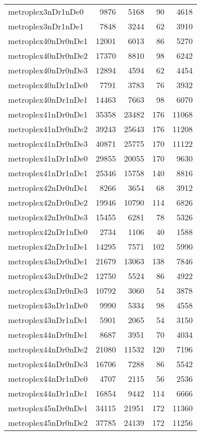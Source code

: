 \begin{longtable}{lrrrr}
metroplex3nDr1nDe0 & 9876 & 5168 & 90 & 4618 \\
metroplex3nDr1nDe1 & 7848 & 3244 & 62 & 3910 \\
metroplex40nDr0nDe1 & 12001 & 6013 & 86 & 5270 \\
metroplex40nDr0nDe2 & 17370 & 8810 & 98 & 6242 \\
metroplex40nDr0nDe3 & 12894 & 4594 & 62 & 4454 \\
metroplex40nDr1nDe0 & 7791 & 3783 & 76 & 3932 \\
metroplex40nDr1nDe1 & 14463 & 7663 & 98 & 6070 \\
metroplex41nDr0nDe1 & 35358 & 23482 & 176 & 11068 \\
metroplex41nDr0nDe2 & 39243 & 25643 & 176 & 11208 \\
metroplex41nDr0nDe3 & 40871 & 25775 & 170 & 11122 \\
metroplex41nDr1nDe0 & 29855 & 20055 & 170 & 9630 \\
metroplex41nDr1nDe1 & 25346 & 15758 & 140 & 8816 \\
metroplex42nDr0nDe1 & 8266 & 3654 & 68 & 3912 \\
metroplex42nDr0nDe2 & 19946 & 10790 & 114 & 6826 \\
metroplex42nDr0nDe3 & 15455 & 6281 & 78 & 5326 \\
metroplex42nDr1nDe0 & 2734 & 1106 & 40 & 1588 \\
metroplex42nDr1nDe1 & 14295 & 7571 & 102 & 5990 \\
metroplex43nDr0nDe1 & 21679 & 13063 & 138 & 7846 \\
metroplex43nDr0nDe2 & 12750 & 5524 & 86 & 4922 \\
metroplex43nDr0nDe3 & 10792 & 3060 & 54 & 3878 \\
metroplex43nDr1nDe0 & 9990 & 5334 & 98 & 4558 \\
metroplex43nDr1nDe1 & 5901 & 2065 & 54 & 3150 \\
metroplex44nDr0nDe1 & 8687 & 3951 & 70 & 4034 \\
metroplex44nDr0nDe2 & 21080 & 11532 & 120 & 7196 \\
metroplex44nDr0nDe3 & 16706 & 7288 & 86 & 5542 \\
metroplex44nDr1nDe0 & 4707 & 2115 & 56 & 2536 \\
metroplex44nDr1nDe1 & 16854 & 9442 & 114 & 6666 \\
metroplex45nDr0nDe1 & 34115 & 21951 & 172 & 11360 \\
metroplex45nDr0nDe2 & 37785 & 24139 & 172 & 11256 \\

\end{longtable}
